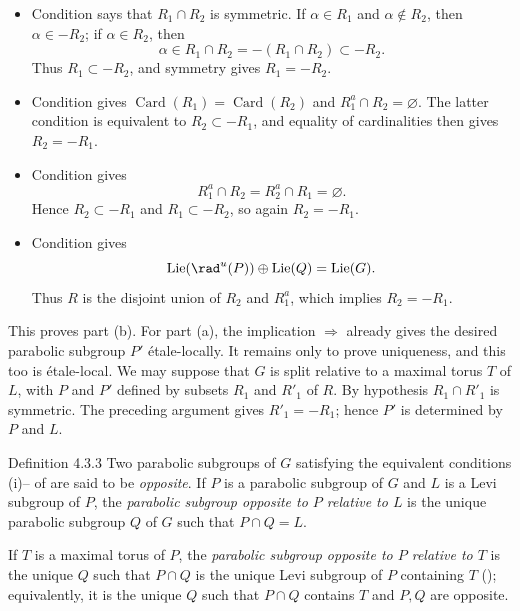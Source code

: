 \begin{itemize}[leftmargin=2em]
\item Condition \textup{} says that \(R_1\cap R_2\) is symmetric.
If \(\alpha\in R_1\) and \(\alpha\notin R_2\), then
\(\alpha\in-R_2\); if \(\alpha\in R_2\), then
\[
 \alpha\in R_1\cap R_2=-(R_1\cap R_2)\subset-R_2.
\]
Thus \(R_1\subset-R_2\), and symmetry gives \(R_1=-R_2\).

\item Condition \textup{} gives
\(\operatorname{Card}(R_1)=\operatorname{Card}(R_2)\) and
\(R_1^a\cap R_2=\varnothing\).  The latter condition is equivalent to
\(R_2\subset-R_1\), and equality of cardinalities then gives
\(R_2=-R_1\).

\item Condition \textup{} gives
\[
 R_1^a\cap R_2=R_2^a\cap R_1=\varnothing.
\]
Hence \(R_2\subset-R_1\) and \(R_1\subset-R_2\), so again
\(R_2=-R_1\).

\item Condition \textup{} gives
\[
 \operatorname{Lie}(\rad^u(P))\oplus\operatorname{Lie}(Q)
 =\operatorname{Lie}(G).
\]
Thus \(R\) is the disjoint union of \(R_2\) and \(R_1^a\), which implies
\(R_2=-R_1\).
\end{itemize}

This proves part \textup{(b)}.  For part \textup{(a)}, the implication
\textup{} \(\Rightarrow\) \textup{} already gives the desired
parabolic subgroup \(P'\) étale-locally.  It remains only to prove
uniqueness, and this too is étale-local.  We may suppose that \(G\) is
split relative to a maximal torus \(T\) of \(L\), with \(P\) and \(P'\)
defined by subsets \(R_1\) and \(R'_1\) of \(R\).  By hypothesis
\(R_1\cap R'_1\) is symmetric.  The preceding argument gives
\(R'_1=-R_1\); hence \(P'\) is determined by \(P\) and \(L\).
\SGAQED

\begin{sgastatement}{Definition 4.3.3}
Two parabolic subgroups of \(G\) satisfying the equivalent conditions
\textup{(i)}--\textup{} of  are said to be
\emph{opposite}.  If \(P\) is a parabolic subgroup of \(G\) and \(L\)
is a Levi subgroup of \(P\), the \emph{parabolic subgroup opposite to
\(P\) relative to \(L\)} is the unique parabolic subgroup \(Q\) of
\(G\) such that \(P\cap Q=L\).

If \(T\) is a maximal torus of \(P\), the \emph{parabolic subgroup
opposite to \(P\) relative to \(T\)} is the unique \(Q\) such that
\(P\cap Q\) is the unique Levi subgroup of \(P\) containing \(T\)
\textup{()}; equivalently, it is the unique \(Q\) such that
\(P\cap Q\) contains \(T\) and \(P,Q\) are opposite.
\end{sgastatement}

